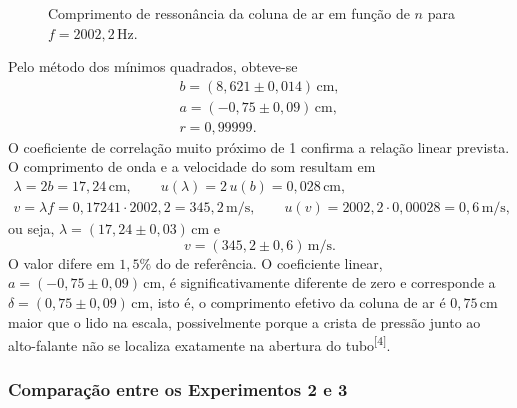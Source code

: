 \documentclass[12pt, a4paper]{article}
\newcommand{\un}[1]{\,\mathrm{#1}}
\newcommand{\cita}[1]{\textsuperscript{[#1]}}
\newcommand{\fonte}[1]{\par\vspace{2pt}{\footnotesize Fonte: #1}}
\begin{document}
\begin{figure}[H]
\centering
\caption{Comprimento de ressonância da coluna de ar em função de $n$ para $f=2002{,}2\un{Hz}$.}
\label{fig:som_L}
\fonte{Elaborada pelos autores.}
\end{figure}

Pelo método dos mínimos quadrados, obteve-se
\begin{gather*}
b=(8{,}621\pm0{,}014)\un{cm},\\
a=(-0{,}75\pm0{,}09)\un{cm},\\
r=0{,}99999.
\end{gather*}
O coeficiente de correlação muito próximo de 1 confirma a relação linear prevista. O comprimento de onda e a velocidade do som resultam em
\begin{gather*}
\lambda=2b=17{,}24\un{cm},\qquad u(\lambda)=2\,u(b)=0{,}028\un{cm},\\
v=\lambda f=0{,}17241\cdot2002{,}2=345{,}2\un{m/s},\qquad u(v)=2002{,}2\cdot0{,}00028=0{,}6\un{m/s},
\end{gather*}
ou seja, $\lambda=(17{,}24\pm0{,}03)\un{cm}$ e
\[
v=(345{,}2\pm0{,}6)\un{m/s}.
\]
O valor difere em $1{,}5\%$ do de referência. O coeficiente linear, $a=(-0{,}75\pm0{,}09)\un{cm}$, é significativamente diferente de zero e corresponde a $\delta=(0{,}75\pm0{,}09)\un{cm}$, isto é, o comprimento efetivo da coluna de ar é $0{,}75\un{cm}$ maior que o lido na escala, possivelmente porque a crista de pressão junto ao alto-falante não se localiza exatamente na abertura do tubo\cita{4}.

\subsubsection{Comparação entre os Experimentos 2 e 3}
\end{document}
